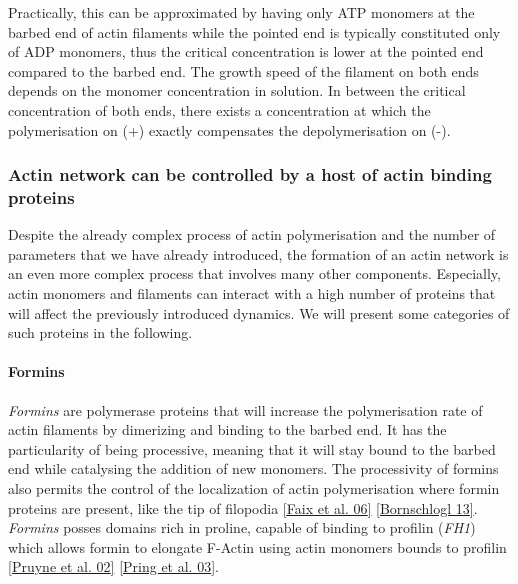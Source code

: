 \documentclass[A4paperpaper,11pt,english]{sphinxmanual}
\begin{document}
Practically, this can be approximated by having only ATP monomers at the barbed
end of actin filaments while the pointed end is typically constituted only of
ADP monomers, thus the critical concentration is lower at the  pointed end
compared to the barbed end. The growth speed of the filament on both
ends depends on the monomer concentration in solution. In between the
critical concentration of both ends, there exists a concentration at which the
polymerisation on (+) exactly compensates the depolymerisation on (-).


\subsubsection{Actin network can be controlled by a host of actin binding proteins}
\label{parts/part1:actin-network-can-be-controlled-by-a-host-of-actin-binding-proteins}
Despite the already complex process of actin polymerisation and the
number of parameters that we have already introduced, the formation of an actin
network is an even more complex process that involves many other components.
Especially, actin monomers and filaments can interact with a high number of
proteins that will affect the previously introduced dynamics.  We will present
some categories of such proteins in the following.


\paragraph{Formins}
\label{parts/part1:formins}
\emph{Formins} are polymerase proteins that will increase the polymerisation rate
of actin filaments by dimerizing and binding to the barbed end. It has the
particularity of being processive, meaning that it will stay bound to the
barbed end while catalysing the addition of new monomers. The processivity of
formins also permits the control of the localization of actin polymerisation
where formin proteins are present, like the tip of filopodia {\hyperref[parts/part1:faix2006]{{[}Faix et al. 06{]}}}
{\hyperref[parts/part1:bornschlogl2013]{{[}Bornschlogl 13{]}}}. \emph{Formins} posses domains rich in proline, capable of
binding to profilin (\emph{FH1}) which allows formin to elongate F-Actin using actin
monomers bounds to profilin {\hyperref[parts/part1:pruyne2002]{{[}Pruyne et al. 02{]}}} {\hyperref[parts/part1:pring2003a]{{[}Pring et al. 03{]}}}.
\end{document}
